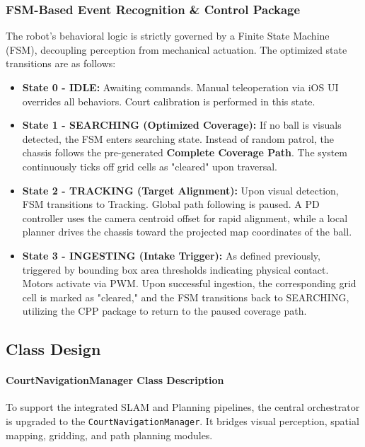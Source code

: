 \subsubsection{FSM-Based Event Recognition \& Control Package}
\label{sec:event-recognition}
The robot's behavioral logic is strictly governed by a Finite State Machine (FSM), decoupling perception from mechanical actuation. The optimized state transitions are as follows:
\begin{itemize}
  \item \textbf{State 0 - IDLE:} Awaiting commands. Manual teleoperation via iOS UI overrides all behaviors. Court calibration is performed in this state.
  \item \textbf{State 1 - SEARCHING (Optimized Coverage):} If no ball is visuals detected, the FSM enters searching state. Instead of random patrol, the chassis follows the pre-generated \textbf{Complete Coverage Path}. The system continuously ticks off grid cells as "cleared" upon traversal.
  \item \textbf{State 2 - TRACKING (Target Alignment):} Upon visual detection, FSM transitions to Tracking. Global path following is paused. A PD controller uses the camera centroid offset for rapid alignment, while a local planner drives the chassis toward the projected map coordinates of the ball.
  \item \textbf{State 3 - INGESTING (Intake Trigger):} As defined previously, triggered by bounding box area thresholds indicating physical contact. Motors activate via PWM. Upon successful ingestion, the corresponding grid cell is marked as "cleared," and the FSM transitions back to SEARCHING, utilizing the CPP package to return to the paused coverage path.
\end{itemize}


\subsection{Class Design}
\label{sec:class-design}

\paragraph{CourtNavigationManager Class Description}

To support the integrated SLAM and Planning pipelines, the central orchestrator is upgraded to the \texttt{CourtNavigationManager}. It bridges visual perception, spatial mapping, gridding, and path planning modules.

